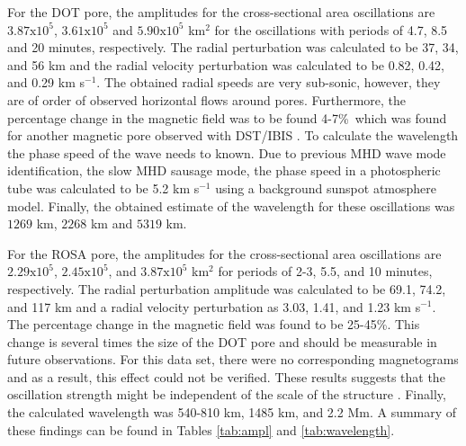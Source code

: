     For the DOT pore, the amplitudes for the cross-sectional area oscillations are $3.87\mathrm{x}10^5$, $3.61\mathrm{x}10^5$ and $5.90\mathrm{x}10^5$ km$^2$ for the oscillations with periods of 4.7, 8.5 and 20 minutes, respectively.
    The radial perturbation was calculated to be 37, 34, and 56 km and the radial velocity perturbation was calculated to be 0.82, 0.42, and 0.29 km s$^{-1}$.
    The obtained radial speeds are very sub-sonic, however, they are of order of observed horizontal flows around pores.
    Furthermore, the percentage change in the magnetic field was to be found 4-7\%\ which was found for another magnetic pore observed with DST/IBIS \citep{0004-637X-806-1-132}.
    To calculate the wavelength the phase speed of the wave needs to known.
    Due to previous MHD wave mode identification, the slow MHD sausage mode, the phase speed in a photospheric tube was calculated to be 5.2 km s$^{-1}$ using a background sunspot atmosphere model.
    Finally, the obtained estimate of the wavelength for these oscillations was $1269$ km, $2268$ km and $5319$ km.
       
	For the ROSA pore, the amplitudes for the cross-sectional area oscillations are $2.29\mathrm{x}10^5$, $2.45\mathrm{x}10^5$, and $3.87\mathrm{x}10^5$ km$^2$ for periods of 2-3, 5.5, and 10 minutes, respectively.
    The radial perturbation amplitude was calculated to be 69.1, 74.2, and 117 km and a radial velocity perturbation as 3.03, 1.41, and 1.23 km s$^{-1}$.
    The percentage change in the magnetic field was found to be  25-45\%.
    This change is several times the size of the DOT pore and should be measurable in future observations. 
    For this data set, there were no corresponding magnetograms and as a result, this effect could not be verified.
    These results suggests that the oscillation strength might be independent of the scale of the structure \citep{Dorotovic2014}. 
    Finally, the calculated wavelength was 540-810 km, 1485 km, and 2.2 Mm.
    A summary of these findings can be found in Tables \ref{tab:ampl} and \ref{tab:wavelength}.
      
